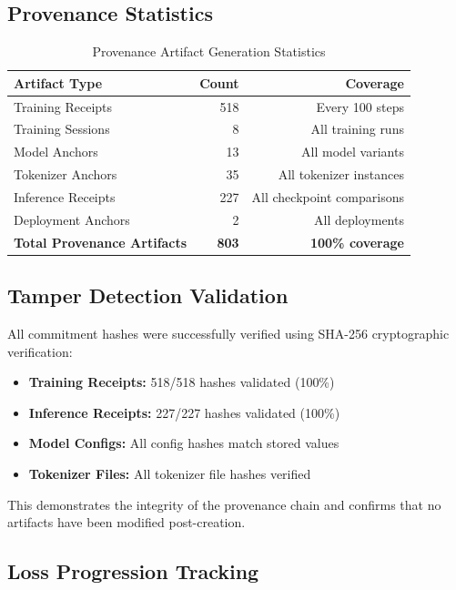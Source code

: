 \documentclass[11pt,a4paper]{article}
\begin{document}
\subsection{Provenance Statistics}

\begin{table}[H]
\centering
\begin{tabular}{lrr}
\toprule
\textbf{Artifact Type} & \textbf{Count} & \textbf{Coverage} \\
\midrule
Training Receipts & 518 & Every 100 steps \\
Training Sessions & 8 & All training runs \\
Model Anchors & 13 & All model variants \\
Tokenizer Anchors & 35 & All tokenizer instances \\
Inference Receipts & 227 & All checkpoint comparisons \\
Deployment Anchors & 2 & All deployments \\
\midrule
\textbf{Total Provenance Artifacts} & \textbf{803} & \textbf{100\% coverage} \\
\bottomrule
\end{tabular}
\caption{Provenance Artifact Generation Statistics}
\label{tab:provenance-stats}
\end{table}

\subsection{Tamper Detection Validation}

All commitment hashes were successfully verified using SHA-256 cryptographic verification:

\begin{itemize}
    \item \textbf{Training Receipts:} 518/518 hashes validated (100\%)
    \item \textbf{Inference Receipts:} 227/227 hashes validated (100\%)
    \item \textbf{Model Configs:} All config hashes match stored values
    \item \textbf{Tokenizer Files:} All tokenizer file hashes verified
\end{itemize}

This demonstrates the integrity of the provenance chain and confirms that no artifacts have been modified post-creation.

\subsection{Loss Progression Tracking}
\end{document}
